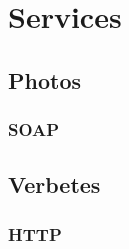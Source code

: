 \chapter{Services}
\label{sec:chapter4}

\section{Photos}
\label{sec:chapter4:photos}

\subsection{SOAP}
\label{sec:chapter4:photos:soap}

\section{Verbetes}
\label{sec:chapter4:verbetes}

\subsection{HTTP}
\label{sec:chapter4:verbetes}
